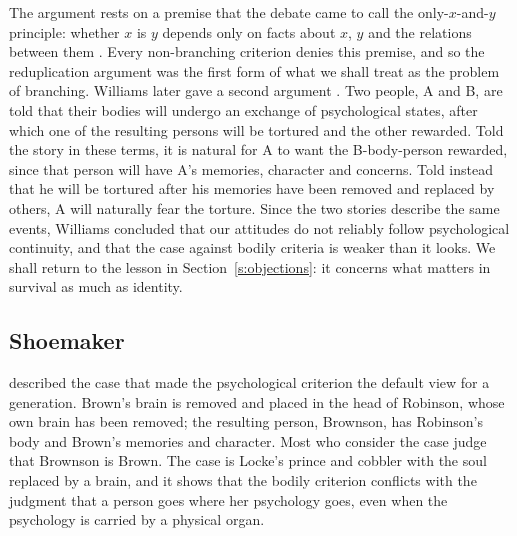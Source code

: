 \documentclass{situationist-preprint}
\begin{document}
The argument rests on a premise that the debate came to call the only-$x$-and-$y$ principle: whether $x$ is $y$ depends only on facts about $x$, $y$ and the relations between them \citep{Wiggins1980,Noonan1985}. Every non-branching criterion denies this premise, and so the reduplication argument was the first form of what we shall treat as the problem of branching. Williams later gave a second argument \citep{Williams1970}. Two people, A and B, are told that their bodies will undergo an exchange of psychological states, after which one of the resulting persons will be tortured and the other rewarded. Told the story in these terms, it is natural for A to want the B-body-person rewarded, since that person will have A's memories, character and concerns. Told instead that he will be tortured after his memories have been removed and replaced by others, A will naturally fear the torture. Since the two stories describe the same events, Williams concluded that our attitudes do not reliably follow psychological continuity, and that the case against bodily criteria is weaker than it looks. We shall return to the lesson in Section~\ref{s:objections}: it concerns what matters in survival as much as identity.

\subsection{Shoemaker}

\citet{Shoemaker1963} described the case that made the psychological criterion the default view for a generation. Brown's brain is removed and placed in the head of Robinson, whose own brain has been removed; the resulting person, Brownson, has Robinson's body and Brown's memories and character. Most who consider the case judge that Brownson is Brown. The case is Locke's prince and cobbler with the soul replaced by a brain, and it shows that the bodily criterion conflicts with the judgment that a person goes where her psychology goes, even when the psychology is carried by a physical organ.
\end{document}
